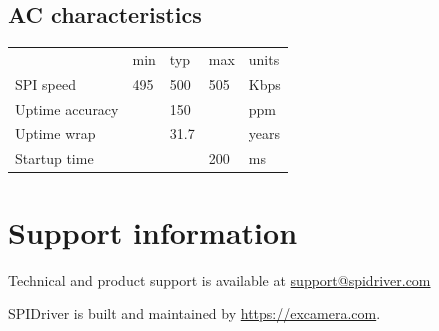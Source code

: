 \documentclass{article}
\newcommand{\heavyline}{\specialrule{1pt}{1pt}{1pt}}
\begin{document}
\subsection{AC characteristics}
\vspace{10 pt}

{\renewcommand{\arraystretch}{1.2}%
\begin{tabularx}{\linewidth}{XC{40pt}C{40pt}C{40pt}C{40pt}}
\heavyline
& min & typ & max & units \\ \heavyline

SPI speed                     &495& 500 &505& Kbps   \\ \hline
Uptime accuracy               && 150 && ppm           \\ \hline
Uptime wrap                   && 31.7 && years        \\ \hline
Startup time & & & 200 & ms \\ \hline
\end{tabularx}}
\vspace{10 pt}

\section{Support information}

Technical and product support is available at
\href{mailto:support@spidriver.com}{support@spidriver.com}

SPIDriver is built and maintained by
\href{Excamera Labs}{https://excamera.com}.
\end{document}
